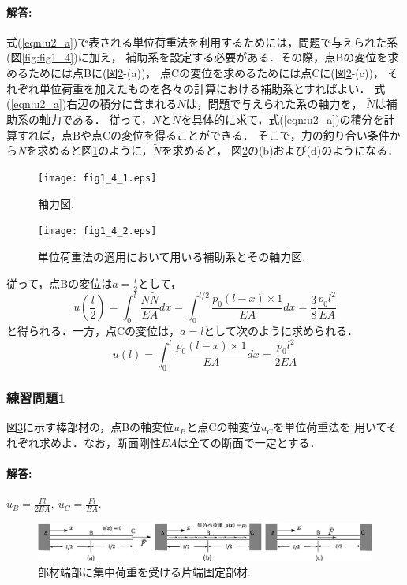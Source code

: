 \documentclass[10pt,a4j]{jarticle}
\begin{document}
\paragraph{解答:}
式(\ref{eqn:u2_a})で表される単位荷重法を利用するためには，問題で与えられた系(図\ref{fig:fig1_4})に加え，
補助系を設定する必要がある．その際，点Bの変位を求めるためには点Bに(図\ref{fig:fig1_4_2}-(a))，
点Cの変位を求めるためには点Cに(図\ref{fig:fig1_4_2}-(c))，
それぞれ単位荷重を加えたものを各々の計算における補助系とすればよい．
式(\ref{eqn:u2_a})右辺の積分に含まれる$N$は，問題で与えられた系の軸力を，
$\tilde N$は補助系の軸力である．
従って，$N$と$\tilde N$を具体的に求て，式(\ref{eqn:u2_a})の積分を計算すれば，点Bや点Cの変位を得ることができる．
そこで，力の釣り合い条件から$N$を求めると図\ref{fig:fig1_4_1}のように，$\tilde N$を求めると，
図\ref{fig:fig1_4_2}の(b)および(d)のようになる．
\begin{figure}[h]
	\begin{center}
	\texttt{[image: fig1\_4\_1.eps]} 
	\end{center}
	\caption{軸力図.} 
	\label{fig:fig1_4_1}
\end{figure}
\begin{figure}[h]
	\begin{center}
	\texttt{[image: fig1\_4\_2.eps]} 
	\end{center}
	\caption{単位荷重法の適用において用いる補助系とその軸力図.} 
	\label{fig:fig1_4_2}
\end{figure}
従って，点Bの変位は$a=\frac{l}{2}$として，
\begin{equation}
	u\left(\frac{l}{2} \right)
	=
	\int _0^l \frac{N\tilde N}{EA}dx
	=
	\int _0^{l/2} \frac{p_0(l-x)\times 1}{EA}dx=\frac{3}{8}\frac{p_0l^2}{EA}
	\label{eqn:}
\end{equation}
と得られる．一方，点Cの変位は，$a=l$として次のように求められる．
\begin{equation}
	u(l)=\int_0^l\frac{p_0(l-x)\times 1}{EA}dx=\frac{p_0l^2}{2EA}
	\label{eqn:}
\end{equation}
\subsubsection{練習問題1}
図\ref{fig:fig1_5}に示す棒部材の，点Bの軸変位$u_B$と点Cの軸変位$u_C$を単位荷重法を
用いてそれぞれ求めよ．なお，断面剛性$EA$は全ての断面で一定とする．
\paragraph{解答:}
$u_B=\frac{\bar Fl}{2EA},\ u_C=\frac{\bar Fl}{EA}.$
\begin{figure}[h]
	\begin{center}
	\includegraphics[width=0.4\linewidth]{fig1_5.eps} 
	\end{center}
	\caption{部材端部に集中荷重を受ける片端固定部材.} 
	\label{fig:fig1_5}
\end{figure}
\end{document}
